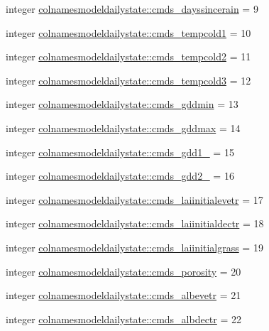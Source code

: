 \begin{DoxyCompactItemize}
\item 
integer \hyperlink{namespacecolnamesmodeldailystate_a6862cbb0931e20815992cc1185267c44}{colnamesmodeldailystate\+::cmds\+\_\+dayssincerain} = 9
\item 
integer \hyperlink{namespacecolnamesmodeldailystate_a0e35922fff6c3bf5f04bcc40a503dff1}{colnamesmodeldailystate\+::cmds\+\_\+tempcold1} = 10
\item 
integer \hyperlink{namespacecolnamesmodeldailystate_ac8218de315f15aff2dee7df1fd7d9a0a}{colnamesmodeldailystate\+::cmds\+\_\+tempcold2} = 11
\item 
integer \hyperlink{namespacecolnamesmodeldailystate_ac06601f1cc10c6db54d31dbd32095df6}{colnamesmodeldailystate\+::cmds\+\_\+tempcold3} = 12
\item 
integer \hyperlink{namespacecolnamesmodeldailystate_abcedf7efc1a3412f948b812e450ed2a5}{colnamesmodeldailystate\+::cmds\+\_\+gddmin} = 13
\item 
integer \hyperlink{namespacecolnamesmodeldailystate_aa084d67416748ce2d9c312f3adefdbb8}{colnamesmodeldailystate\+::cmds\+\_\+gddmax} = 14
\item 
integer \hyperlink{namespacecolnamesmodeldailystate_a7d365d809a7adfa1569d1b95c4542c6c}{colnamesmodeldailystate\+::cmds\+\_\+gdd1\+\_} = 15
\item 
integer \hyperlink{namespacecolnamesmodeldailystate_a21dad7f8e9809f4bc008d481ca7baae6}{colnamesmodeldailystate\+::cmds\+\_\+gdd2\+\_} = 16
\item 
integer \hyperlink{namespacecolnamesmodeldailystate_a5777d9b190fac1cf9aa6ecfb89885689}{colnamesmodeldailystate\+::cmds\+\_\+laiinitialevetr} = 17
\item 
integer \hyperlink{namespacecolnamesmodeldailystate_aa66f874f1b30cb2d8b55d103df157ca4}{colnamesmodeldailystate\+::cmds\+\_\+laiinitialdectr} = 18
\item 
integer \hyperlink{namespacecolnamesmodeldailystate_a09bb2691e70be909f17a634e348c8d06}{colnamesmodeldailystate\+::cmds\+\_\+laiinitialgrass} = 19
\item 
integer \hyperlink{namespacecolnamesmodeldailystate_a957bd1ccda6eb2f03bf72168b553d9dd}{colnamesmodeldailystate\+::cmds\+\_\+porosity} = 20
\item 
integer \hyperlink{namespacecolnamesmodeldailystate_af2fc190d2d8dff609b707af93fdbac86}{colnamesmodeldailystate\+::cmds\+\_\+albevetr} = 21
\item 
integer \hyperlink{namespacecolnamesmodeldailystate_a7215ae93ab4bad6d2f013107f3ab2a06}{colnamesmodeldailystate\+::cmds\+\_\+albdectr} = 22

\end{DoxyCompactItemize}
